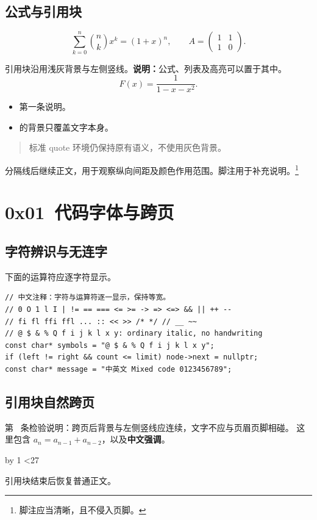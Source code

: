 \documentclass{article}
\begin{document}
\subsection{公式与引用块}
\[
 \sum_{k=0}^{n}\binom{n}{k}x^k=(1+x)^n,\qquad
 A=\begin{pmatrix}1&1\\1&0\end{pmatrix}.
\]
\begin{quoteblock}
引用块沿用浅灰背景与左侧竖线。\textbf{说明：}公式、列表及高亮可以置于其中。
\[
 F(x)=\frac{1}{1-x-x^2}.
\]
\begin{itemize}
\item 第一条说明。
\item {}的背景只覆盖文字本身。
\end{itemize}
\end{quoteblock}
\begin{quote}
标准 quote 环境仍保持原有语义，不使用灰色背景。
\end{quote}
\Separator{}
分隔线后继续正文，用于观察纵向间距及颜色作用范围。脚注用于补充说明。\footnote{脚注应当清晰，且不侵入页脚。}

\section{0x01\ 代码字体与跨页}
\subsection{字符辨识与无连字}
下面的运算符应逐字符显示。
\begin{verbatim}
// 中文注释：字符与运算符逐一显示，保持等宽。
// 0 O 1 l I | != == === <= >= -> => <=> && || ++ --
// fi fl ffi ffl ... :: << >> /* */ // __ ~~
// @ $ & % Q f i j k l x y: ordinary italic, no handwriting
const char* symbols = "@ $ & % Q f i j k l x y";
if (left != right && count <= limit) node->next = nullptr;
const char* message = "中英文 Mixed code 0123456789";
\end{verbatim}
\subsection{引用块自然跨页}
\begin{quoteblock}
\newcount\sampleline
{}
\loop
第 \the\sampleline\ 条检验说明：跨页后背景与左侧竖线应连续，文字不应与页眉页脚相碰。
这里包含 $a_n=a_{n-1}+a_{n-2}$，以及\textbf{中文强调}。\par
\advance\sampleline by 1
\ifnum\sampleline<27
\repeat
\end{quoteblock}
引用块结束后恢复普通正文。
\end{document}
